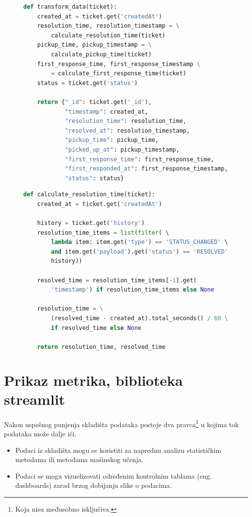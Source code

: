 \documentclass[12pt,oneside]{memoir}
\begin{document}
\begin{figure}[h]
\begin{lstlisting}[language=python, caption={Funkcija koja transformiše podatke.}, label={lst:ticketetltransformfunction}]
def transform_data(ticket):
    created_at = ticket.get('createdAt')
    resolution_time, resolution_timestamp = \
        calculate_resolution_time(ticket)
    pickup_time, pickup_timestamp = \
        calculate_pickup_time(ticket)
    first_response_time, first_response_timestamp \
        = calculate_first_response_time(ticket)
    status = ticket.get('status')

    return {"_id": ticket.get('_id'),
            "timestamp": created_at,
            "resolution_time": resolution_time,
            "resolved_at": resolution_timestamp,
            "pickup_time": pickup_time,
            "picked_up_at": pickup_timestamp,
            "first_response_time": first_response_time,
            "first_responded_at": first_response_timestamp,
            "status": status}
\end{lstlisting}
\end{figure}

\begin{figure}[h]
\begin{lstlisting}[language=python, caption={Računanje konkretne metrike.}, label={lst:ticketetlconcretefunction}]
def calculate_resolution_time(ticket):
    created_at = ticket.get('createdAt')

    history = ticket.get('history')
    resolution_time_items = list(filter( \ 
        lambda item: item.get('type') == 'STATUS_CHANGED' \
        and item.get('payload').get('status') == 'RESOLVED', \
        history))

    resolved_time = resolution_time_items[-1].get(
        'timestamp') if resolution_time_items else None

    resolution_time = \
        (resolved_time - created_at).total_seconds() / 60 \
        if resolved_time else None

    return resolution_time, resolved_time
\end{lstlisting}
\end{figure}



\newpage
\section{Prikaz metrika, biblioteka streamlit}

Nakon uspešnog punjenja skladišta podataka postoje dva pravca\footnote{Koja nisu međusobno isključiva.} u kojima tok podataka može dalje ići.
\begin{itemize}
    \item Podaci iz skladišta mogu se koristiti za naprednu analizu statističkim metodama ili metodama mašinskog učenja.
    \item Podaci se mogu vizuelizovati određenim kontrolnim tablama (eng. dashboards) zarad brzog dobijanja slike o podacima.
\end{itemize}
\end{document}
